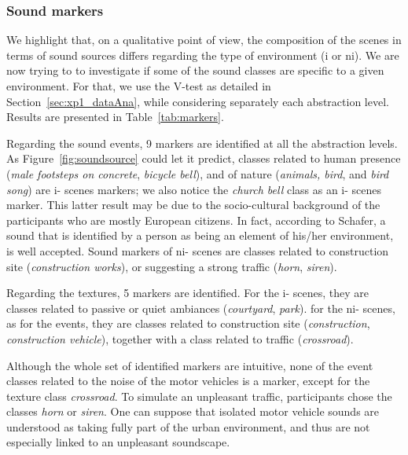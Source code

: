 \documentclass[twoside,twocolumn]{article}
\begin{document}
\subsubsection*{Sound markers}

We highlight that, on a qualitative point of view, the composition of the scenes in terms of sound sources differs regarding the type of environment (i or ni). We are now trying to to investigate if some of the sound classes are specific to a given environment. For that, we use the V-test as detailed in  Section~\ref{sec:xp1_dataAna}, while considering separately each abstraction level. Results are presented in Table~\ref{tab:markers}.

Regarding the sound events, 9 markers are identified at all the abstraction levels. As Figure~\ref{fig:soundsource} could let it predict, classes related to human presence (\emph{male footsteps on concrete}, \emph{bicycle bell}), and of nature (\emph{animals, bird}, and \emph{bird song}) are i- scenes markers; we also notice the \emph{church bell} class as an i- scenes marker. This latter result may be due to the socio-cultural background of the participants who are mostly European citizens. In fact, according to Schafer, a sound that is identified by a person as being an element of his/her environment, is well accepted. Sound markers of ni- scenes are classes related to construction site (\emph{construction works}), or suggesting a strong traffic (\emph{horn}, \emph{siren}).

Regarding the textures, 5 markers are identified. For the i- scenes, they are classes related to passive or quiet ambiances (\emph{courtyard}, \emph{park}). for the ni- scenes, as for the events, they are classes related to construction site (\emph{construction}, \emph{construction vehicle}), together with a class related to traffic (\emph{crossroad}).

Although the whole set of identified markers are intuitive, none of the event classes related to the noise of the motor vehicles is a marker, except for the texture class \emph{crossroad}. To simulate an unpleasant traffic, participants chose the classes \emph{horn} or \emph{siren}. One can suppose that isolated motor vehicle sounds are understood as taking fully part of the urban environment, and thus are not especially linked to an unpleasant soundscape.
\end{document}
